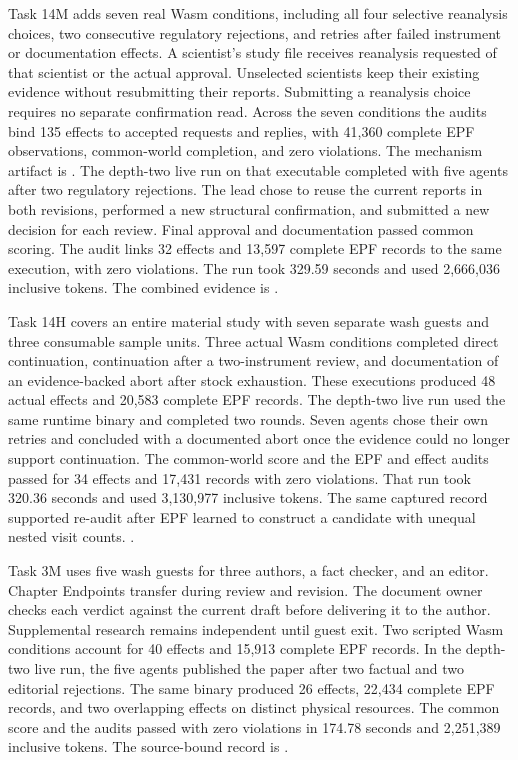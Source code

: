 \documentclass[10pt]{article}
\begin{document}
Task 14M adds seven real Wasm conditions, including all four selective
reanalysis choices, two consecutive regulatory rejections, and retries after
failed instrument or documentation effects. A scientist's study file receives
reanalysis requested of that scientist or the actual approval. Unselected
scientists keep their existing evidence without resubmitting their reports.
Submitting a reanalysis choice requires no separate confirmation read.
Across the seven conditions the audits bind 135 effects to accepted requests
and replies, with 41,360 complete EPF observations, common-world completion,
and zero violations. The mechanism artifact is
.
The depth-two live run on that executable completed with five agents after
two regulatory rejections. The lead chose to reuse the current reports in both
revisions, performed a new structural confirmation, and submitted a new
decision for each review. Final approval and documentation passed common
scoring. The audit links 32 effects and 13,597 complete EPF records to the
same execution, with zero violations. The run took 329.59 seconds and used
2,666,036 inclusive tokens. The combined evidence is
.

Task 14H covers an entire material study with seven separate wash guests and
three consumable sample units. Three actual Wasm conditions completed direct
continuation, continuation after a two-instrument review, and documentation of
an evidence-backed abort after stock exhaustion. These executions produced
48 actual effects and 20,583 complete EPF records. The depth-two live run used
the same runtime binary and completed two rounds. Seven agents chose their
own retries and concluded with a documented abort once the evidence could no
longer support continuation. The common-world score and the EPF and effect
audits passed for 34 effects and 17,431 records with zero violations. That run
took 320.36 seconds and used 3,130,977 inclusive tokens. The same captured
record supported re-audit after EPF learned to construct a candidate with
unequal nested visit counts.
.

Task 3M uses five wash guests for three authors, a fact checker, and an
editor. Chapter Endpoints transfer during review and revision. The document
owner checks each verdict against the current draft before delivering it
to the author. Supplemental research remains independent until guest exit.
Two scripted Wasm conditions account for 40 effects and 15,913 complete
EPF records. In the depth-two live run, the five agents published the paper
after two factual and two editorial rejections. The same binary produced
26 effects, 22,434 complete EPF records, and two overlapping effects on
distinct physical resources. The common score and the audits passed with
zero violations in 174.78 seconds and 2,251,389 inclusive tokens. The
source-bound record is
.
\end{document}
